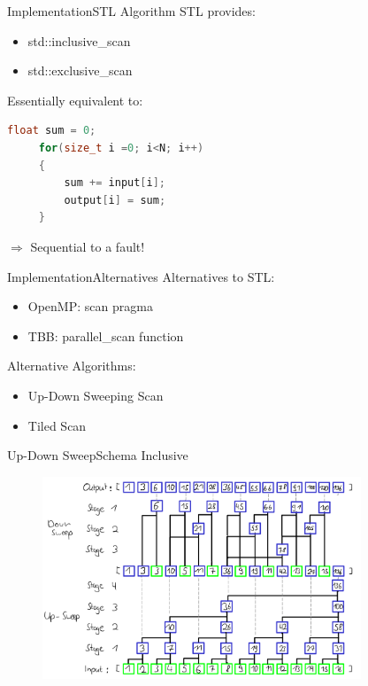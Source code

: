 \begin{frame}[fragile]{Implementation}{STL Algorithm}
    STL provides:
    \begin{itemize}
        \item std::inclusive\_scan
        \item std::exclusive\_scan
    \end{itemize}
    \vspace{10pt}
    Essentially equivalent to:\\
    
     \begin{lstlisting}[language=C++, frame=single, gobble=4]
     float sum = 0;
     for(size_t i =0; i<N; i++)
     {
         sum += input[i];
         output[i] = sum;
     }
     \end{lstlisting}
    \begin{center} $\Rightarrow$ Sequential to a fault! \end{center}
 
\end{frame} 

\begin{frame}{Implementation}{Alternatives}
    Alternatives to STL:
    \begin{itemize}
        \item OpenMP: scan pragma
        \item TBB: parallel\_scan function
    \end{itemize}
    \vspace{10pt}
    \vspace{10pt}
    Alternative Algorithms:
    \begin{itemize}
     \item Up-Down Sweeping Scan
     \item Tiled Scan
    \end{itemize}
\end{frame} 

\begin{frame}{Up-Down Sweep}{Schema Inclusive}
 \begin{figure}
  \centering
  \includegraphics[width=0.85\textwidth]{wiki/InclusiveUpDown}
 \end{figure}
\end{frame}

